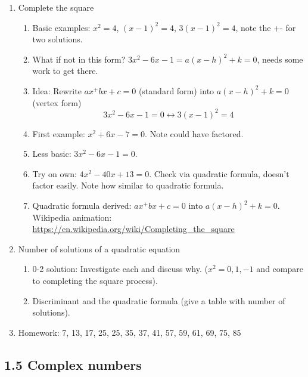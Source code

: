 \documentclass{article}
\begin{document}
\begin{enumerate}
\item Complete the square
\begin{enumerate}
\item Basic examples: $x^2 = 4$, $(x-1)^2 = 4$, $3(x-1)^2=4$, note the +- for two solutions.
\item What if not in this form? $3x^2-6x-1=a(x-h)^2+k=0$, needs some work to get there.
\item Idea: Rewrite $ax^+bx+c=0$ (standard form) into $a(x-h)^2+k = 0$ (vertex form)
\[
3x^2-6x-1=0 \leftrightarrow 3(x-1)^2=4
\]
\item First example: $x^2+6x-7=0$. Note could have factored.
\item Less basic: $3x^2-6x-1=0$. 
\item Try on own: $4x^2-40x+13=0$. Check via quadratic formula, doesn’t factor easily. Note how similar to quadratic formula.
\item Quadratic formula derived: $ax^+bx+c=0$ into $a(x-h)^2+k = 0$. Wikipedia animation: \url{https://en.wikipedia.org/wiki/Completing_the_square}
\end{enumerate}

\item Number of solutions of a quadratic equation
\begin{enumerate}
\item 0-2 solution: Investigate each and discuss why. ($x^2=0,1,-1$ and compare to completing the square process). 
\item Discriminant and the quadratic formula (give a table with number of solutions).
\end{enumerate}

\item Homework: 7, 13, 17, 25, 25, 35, 37, 41, 57, 59, 61, 69, 75, 85

\end{enumerate}


\subsection{1.5 Complex numbers}
\end{document}
